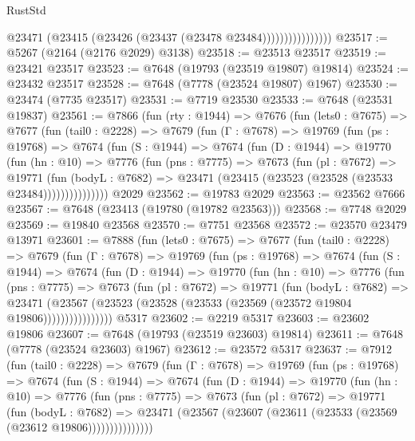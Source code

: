 \begin{lexlean}{RustStd}
\begin{coremodule}
{\begin{coremodule}
{{{{{{{{{{{{{{{{{{{{{{{{{{{{{{{{{{{{{{{{{{{{{{{{{{{{{                          @23471 (@23415 (@23426 (@23437 (@23478 @23484))))))))))))))))
@23517 := @5267 (@2164 (@2176 @2029) @3138)
@23518 := @23513 @23517
@23519 := @23421 @23517
@23523 := @7648 (@19793 (@23519 @19807) @19814)
@23524 := @23432 @23517
@23528 := @7648 (@7778 (@23524 @19807) @1967)
@23530 := @23474 (@7735 @23517)
@23531 := @7719 @23530
@23533 := @7648 (@23531 @19837)
@23561 := @7866
    (fun (rty : @1944) =>
    @7676
      (fun (lets0 : @7675) =>
      @7677
        (fun (tail0 : @2228) =>
        @7679
          (fun (Γ : @7678) =>
          @19769
            (fun (ps : @19768) =>
            @7674
              (fun (S : @1944) =>
              @7674
                (fun (D : @1944) =>
                @19770
                  (fun (hn : @10) =>
                  @7776
                    (fun (pns : @7775) =>
                    @7673
                      (fun (pl : @7672) =>
                      @19771
                        (fun (bodyL : @7682) =>
                        @23471 (@23415 (@23523 (@23528 (@23533 @23484)))))))))))))))
    @2029
@23562 := @19783 @2029
@23563 := @23562 @7666
@23567 := @7648 (@23413 (@19780 (@19782 @23563)))
@23568 := @7748 @2029
@23569 := @19840 @23568
@23570 := @7751 @23568
@23572 := @23570 @23479 @13971
@23601 := @7888
    (fun (lets0 : @7675) =>
    @7677
      (fun (tail0 : @2228) =>
      @7679
        (fun (Γ : @7678) =>
        @19769
          (fun (ps : @19768) =>
          @7674
            (fun (S : @1944) =>
            @7674
              (fun (D : @1944) =>
              @19770
                (fun (hn : @10) =>
                @7776
                  (fun (pns : @7775) =>
                  @7673
                    (fun (pl : @7672) =>
                    @19771
                      (fun (bodyL : @7682) =>
                      @23471
                        (@23567
                          (@23523 (@23528 (@23533 (@23569 (@23572 @19804 @19806))))))))))))))))
    @5317
@23602 := @2219 @5317
@23603 := @23602 @19806
@23607 := @7648 (@19793 (@23519 @23603) @19814)
@23611 := @7648 (@7778 (@23524 @23603) @1967)
@23612 := @23572 @5317
@23637 := @7912
    (fun (tail0 : @2228) =>
    @7679
      (fun (Γ : @7678) =>
      @19769
        (fun (ps : @19768) =>
        @7674
          (fun (S : @1944) =>
          @7674
            (fun (D : @1944) =>
            @19770
              (fun (hn : @10) =>
              @7776
                (fun (pns : @7775) =>
                @7673
                  (fun (pl : @7672) =>
                  @19771
                    (fun (bodyL : @7682) =>
                    @23471 (@23567 (@23607 (@23611 (@23533 (@23569 (@23612 @19806)))))))))))))))
}}}}}}}}}}}}}}}}}}}}}}}}}}}}}}}}}}}}}}}}}}}}}}}}}}}}}
\end{coremodule}}
\end{coremodule}
\end{lexlean}
